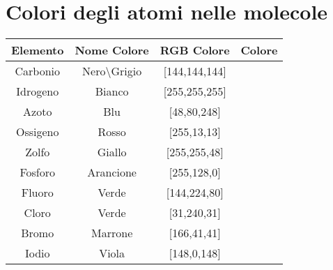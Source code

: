 \chapter{Colori degli atomi nelle molecole}
\begingroup
\renewcommand{\arraystretch}{2}
\begin{table}[H]
	\centering
	\begin{tabular}{cccc}
		\toprule
		\textbf{Elemento} & \textbf{Nome Colore}      & \textbf{RGB Colore} & \textbf{Colore}        \\
		\midrule
		Carbonio          & Nero\textbackslash Grigio & [144,144,144]       & \cellcolor{Carbon}     \\
		Idrogeno          & Bianco                    & [255,255,255]       & \cellcolor{Hydrogen}   \\
		Azoto             & Blu                       & [48,80,248]         & \cellcolor{Nitrogen}   \\
		Ossigeno          & Rosso                     & [255,13,13]         & \cellcolor{Oxygen}     \\
		Zolfo             & Giallo                    & [255,255,48]        & \cellcolor{Sulfur}     \\
		Fosforo           & Arancione                 & [255,128,0]         & \cellcolor{Phosphorus} \\
		Fluoro            & Verde                     & [144,224,80]        & \cellcolor{Fluorine}   \\
		Cloro             & Verde                     & [31,240,31]         & \cellcolor{Chlorine}   \\
		Bromo             & Marrone                    & [166,41,41]         & \cellcolor{Bromine}    \\
		Iodio             & Viola                     & [148,0,148]         & \cellcolor{Iodine}     \\
		\bottomrule
	\end{tabular}
\end{table}
\endgroup

